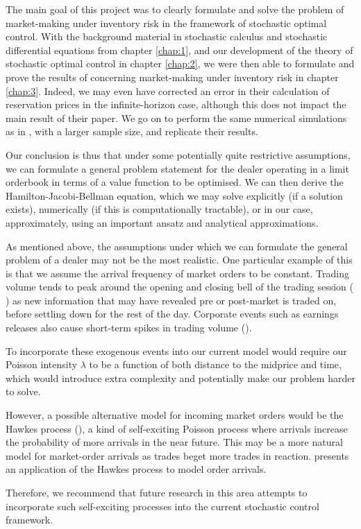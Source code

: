 The main goal of this project was to clearly formulate and solve the problem of 
market-making under inventory risk in the framework of stochastic optimal control.
With the background material in stochastic calculus and stochastic differential 
equations from chapter \ref{chap:1}, and our development of the theory of 
stochastic optimal control in chapter \ref{chap:2}, we were then able to formulate 
and prove the results of \textcite{AS2008} concerning market-making under inventory 
risk in chapter \ref{chap:3}. Indeed, we may even have corrected an error in their calculation
of reservation prices in the infinite-horizon case, although this does not impact the 
main result of their paper. We go on to perform the same numerical simulations as 
in \textcite{AS2008}, with a larger sample size, and replicate their results.

Our conclusion is thus that under some potentially quite restrictive assumptions,
we can formulate a general problem statement for the dealer operating in a limit 
orderbook in terms of a value function to be optimised. We can then derive the 
Hamilton-Jacobi-Bellman equation, which we may solve explicitly (if a solution exists),
numerically (if this is computationally tractable), or in our case, approximately, using 
an important ansatz and analytical approximations.

As mentioned above, the assumptions under which we can formulate the general 
problem of a dealer may not be the most realistic. One particular example of this 
is that we assume the arrival frequency of market orders to be constant. Trading volume 
tends to peak around the opening and closing bell of the trading session (
\cite{volume}) as new information that may have revealed pre or post-market is traded
on, before settling down for the rest of the day. Corporate events such as earnings 
releases also cause short-term spikes in trading volume (\cite{EarningsPremium}). 

To incorporate these exogenous events into our current model would require our Poisson 
intensity $\lambda$ to be a function of both distance to the midprice and time, which 
would introduce extra complexity and potentially make our problem harder to solve. 

However, a possible alternative model for incoming market orders would be the Hawkes process
(\cite{Hawkes}), a kind of self-exciting Poisson process where arrivals increase the 
probability of more arrivals in the near future. This may be a more natural model for 
market-order arrivals as trades beget more trades in reaction. \textcite{Hawkes2}
presents an application of the Hawkes process to model order arrivals. 

Therefore, we recommend that future research in this area attempts to incorporate 
such self-exciting processes into the current stochastic control framework.
